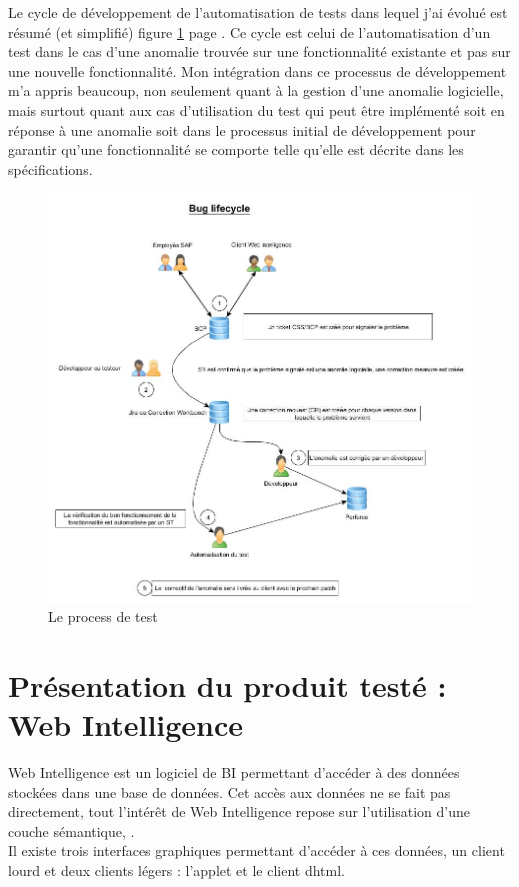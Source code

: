 Le cycle de d\'{e}veloppement de l'automatisation de tests dans lequel j'ai \'{e}volu\'{e} est r\'{e}sum\'{e} (et simplifi\'{e}) figure \ref{figure:testProcess} page \pageref{figure:testProcess}. Ce cycle est celui de l'automatisation d'un test dans le cas d'une anomalie trouv\'{e}e sur une fonctionnalit\'{e} existante et pas sur une nouvelle fonctionnalit\'{e}. Mon int\'{e}gration dans ce processus de d\'{e}veloppement m'a appris beaucoup, non seulement quant \`{a} la gestion d'une anomalie logicielle, mais surtout quant aux cas d'utilisation du test qui peut \^{e}tre impl\'{e}menté soit en r\'{e}ponse \`{a} une anomalie soit dans le processus initial de d\'{e}veloppement pour garantir qu'une fonctionnalit\'{e} se comporte telle qu'elle est d\'{e}crite dans les sp\'{e}cifications.\\
\begin{figure}[!ht]
  \centering
      \includegraphics[width=\textwidth]{images/testProcessAtSAP.jpg}
  \caption{Le process de test}
	\label{figure:testProcess}
\end{figure}
 


\section{Pr\'{e}sentation du produit test\'{e} : Web Intelligence}
Web Intelligence est un logiciel de BI permettant d'acc\'{e}der \`{a} des donn\'{e}es stock\'{e}es dans une base de donn\'{e}es. Cet acc\`{e}s aux donn\'{e}es ne se fait pas directement, tout l'int\'{e}r\^{e}t de Web Intelligence repose sur l'utilisation d'une couche s\'{e}mantique, .\\
Il existe trois interfaces graphiques permettant d'acc\'{e}der \`{a} ces donn\'{e}es, un client lourd et deux clients l\'{e}gers : l'applet et le client dhtml.



